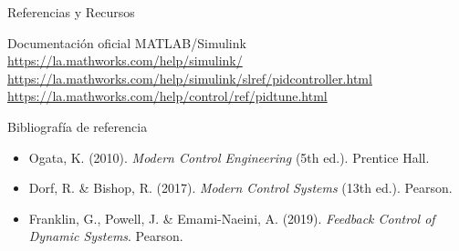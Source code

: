 \documentclass[aspectratio=169,xcolor=dvipsnames]{beamer}
\begin{document}
\begin{frame}{Referencias y Recursos}
    \footnotesize
    \begin{exampleblock}{Documentación oficial MATLAB/Simulink}
        \url{https://la.mathworks.com/help/simulink/}
        \url{https://la.mathworks.com/help/simulink/slref/pidcontroller.html}
        \url{https://la.mathworks.com/help/control/ref/pidtune.html}
    \end{exampleblock}
    \vspace{0.3em}
    \begin{block}{Bibliografía de referencia}
        \begin{itemize}
            \item Ogata, K. (2010). \textit{Modern Control Engineering} (5th ed.). Prentice Hall.
            \item Dorf, R. \& Bishop, R. (2017). \textit{Modern Control Systems} (13th ed.). Pearson.
            \item Franklin, G., Powell, J. \& Emami-Naeini, A. (2019). \textit{Feedback Control of Dynamic Systems}. Pearson.
        \end{itemize}
    \end{block}
\end{frame}


\end{document}
